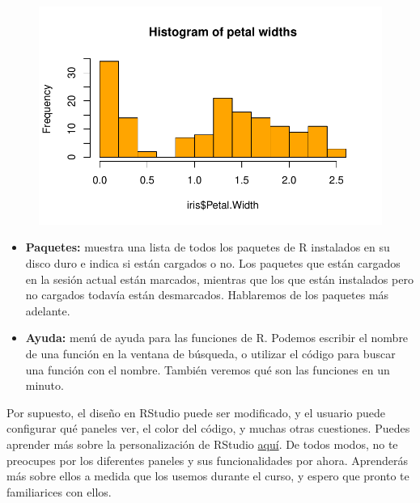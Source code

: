 \documentclass[
  letterpaper,
  DIV=11,
  numbers=noendperiod]{scrreprt}
\newenvironment{Shaded}{\begin{snugshade}}{\end{snugshade}}
\newcommand{\AttributeTok}[1]{\textcolor[rgb]{0.40,0.45,0.13}{#1}}
\newcommand{\FunctionTok}[1]{\textcolor[rgb]{0.28,0.35,0.67}{#1}}
\newcommand{\NormalTok}[1]{\textcolor[rgb]{0.00,0.23,0.31}{#1}}
\newcommand{\SpecialCharTok}[1]{\textcolor[rgb]{0.37,0.37,0.37}{#1}}
\newcommand{\StringTok}[1]{\textcolor[rgb]{0.13,0.47,0.30}{#1}}
\begin{document}
\begin{Shaded}
\end{Shaded}

\begin{figure}[H]

{\centering \includegraphics{00_Familiar_RStudio_files/figure-pdf/unnamed-chunk-1-1.pdf}

}

\end{figure}

\begin{itemize}
\item
  \textbf{Paquetes:} muestra una lista de todos los paquetes de R
  instalados en su disco duro e indica si están cargados o no. Los
  paquetes que están cargados en la sesión actual están marcados,
  mientras que los que están instalados pero no cargados todavía están
  desmarcados. Hablaremos de los paquetes más adelante.
\item
  \textbf{Ayuda:} menú de ayuda para las funciones de R. Podemos
  escribir el nombre de una función en la ventana de búsqueda, o
  utilizar el código para buscar una función con el nombre. También
  veremos qué son las funciones en un minuto.
\end{itemize}

Por supuesto, el diseño en RStudio puede ser modificado, y el usuario
puede configurar qué paneles ver, el color del código, y muchas otras
cuestiones. Puedes aprender más sobre la personalización de RStudio
\href{https://support.posit.co/hc/en-us/articles/200549016-Customizing-the-RStudio-IDE}{aquí}.
De todos modos, no te preocupes por los diferentes paneles y sus
funcionalidades por ahora. Aprenderás más sobre ellos a medida que los
usemos durante el curso, y espero que pronto te familiarices con ellos.
\end{document}
